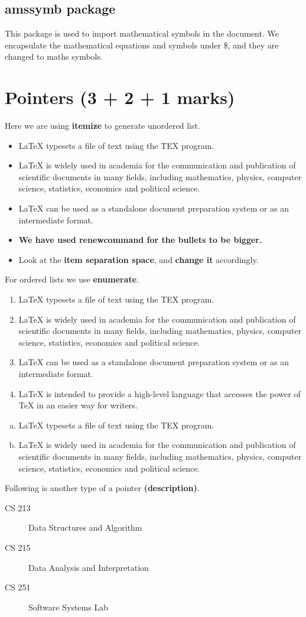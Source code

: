 \documentclass[12pt]{article}
\begin{document}
\subsection{amssymb package}
This package is used to import mathematical symbols in the document. We
encapsulate the mathematical equations and symbols under \$, and they are
changed to maths symbols.
\newpage
\section{Pointers (3 + 2 + 1 marks)}
Here we are using \textbf{itemize} to generate unordered list.
\renewcommand\labelitemi{\large$\bullet$}
\begin{itemize}
	\item \LaTeX{ } typesets a file of text using the TEX program.
	\item \LaTeX{ } is widely used in academia for the communication and publication
	of scientific documents in many fields, including mathematics, physics,
	computer science, statistics, economics and political science.
	\item \LaTeX{ } can be used as a standalone document preparation system or as an
	intermediate format.
	\item  \textbf{We have used renewcommand for the bullets to be bigger.}
	\item  Look at the \textbf{item separation space}, and \textbf{change it} accordingly.
\end{itemize}
For ordered lists we use \textbf{enumerate}.
\begin{enumerate}[I]
	\item \LaTeX{ } typesets a file of text using the TEX program.
	\item \LaTeX{ } is widely used in academia for the communication and publication
	of scientific documents in many fields, including mathematics, physics,
	computer science, statistics, economics and political science.
	\item \LaTeX{ } can be used as a standalone document preparation system or as an
	intermediate format.
	\item \LaTeX{ } is intended to provide a high-level language that accesses the power
	of TeX in an easier way for writers.
	\end{enumerate}
	\begin{enumerate}[(a)]
	\item \LaTeX{ } typesets a file of text using the TEX program.
	\item \LaTeX{ } is widely used in academia for the communication and publication
	of scientific documents in many fields, including mathematics, physics,
	computer science, statistics, economics and political science.
\end{enumerate}
Following is another type of a pointer \textbf{(description)}.
\begin{description}
	\item[CS 213] Data Structures and Algorithm
	\item[CS 215] Data Analysis and Interpretation
	\item[CS 251] Software Systems Lab
\end{description}
\end{document}
